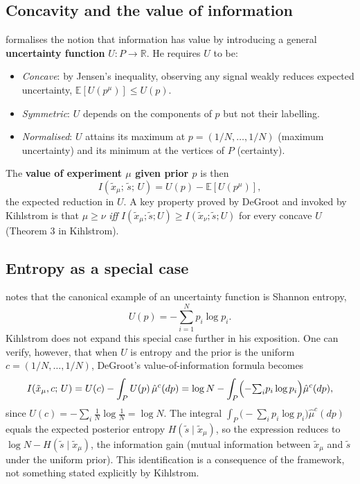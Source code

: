 \documentclass[12pt]{article}
\begin{document}
\subsection{Concavity and the value of information}

\citet{degroot1962} formalises the notion that information has value by
introducing a general \textbf{uncertainty function} $U: P \to \mathbb{R}$.
He requires $U$ to be:
\begin{itemize}
\item \emph{Concave}: by Jensen's inequality, observing any signal weakly
      reduces expected uncertainty, $\mathbb{E}[U(p^\mu)] \leq U(p)$.
\item \emph{Symmetric}: $U$ depends on the components of $p$ but not their
      labelling.
\item \emph{Normalised}: $U$ attains its maximum at $p = (1/N, \ldots, 1/N)$
      (maximum uncertainty) and its minimum at the vertices of $P$ (certainty).
\end{itemize}
The \textbf{value of experiment $\mu$ given prior $p$} is then
\[
I(\tilde{x}_\mu;\, \tilde{s};\, U)
= U(p) - \mathbb{E}[U(p^\mu)],
\]
the expected reduction in $U$.  A key property proved by DeGroot and invoked
by Kihlstrom is that $\mu \geq \nu$ \emph{iff} $I(\tilde{x}_\mu; \tilde{s}; U)
\geq I(\tilde{x}_\nu; \tilde{s}; U)$ for every concave $U$ (Theorem 3 in
Kihlstrom).

\subsection{Entropy as a special case}

\citet{kihlstrom1984} notes that the canonical example of an uncertainty function
is Shannon entropy,
\[
U(p) = -\sum_{i=1}^{N} p_i \log p_i.
\]
Kihlstrom does not expand this special case further in his exposition.  One can
verify, however, that when $U$ is entropy and the prior is the uniform
$c = (1/N, \ldots, 1/N)$, DeGroot's value-of-information formula becomes
\[
I(\tilde{x}_\mu, c;\, U)
= U(c) - \int_P U(p)\,\hat\mu^c(dp)
= \log N - \int_P \Bigl(-{\textstyle\sum_i} p_i \log p_i\Bigr)\hat\mu^c(dp),
\]
since $U(c) = -\sum_i \tfrac{1}{N}\log\tfrac{1}{N} = \log N$.  The integral
$\int_P \bigl(-\sum_i p_i \log p_i\bigr)\hat\mu^c(dp)$ equals the expected
posterior entropy $H(\tilde{s} \mid \tilde{x}_\mu)$, so the expression reduces
to $\log N - H(\tilde{s} \mid \tilde{x}_\mu)$, the information gain
(mutual information between $\tilde{x}_\mu$ and $\tilde{s}$ under the uniform
prior).  This identification is a consequence of the framework, not something
stated explicitly by Kihlstrom.
\end{document}
